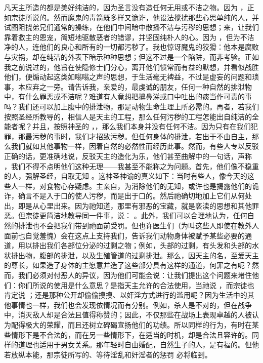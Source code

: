 凡天主所造的都是美好纯洁的，因为圣言没有造任何无用或不洁之物。因为  ，正如宗徒所说的。然而魔鬼的毒箭既多样又诡诈，他设法搅扰那些心思单纯的人，并试图阻挠弟兄们通常的操练，在他们中间暗中散播不洁与污秽的思想；来，让我们靠着救主的恩宠，简短地驱散恶者的错谬，并坚固纯朴人的心。因为  ，但为不洁净的人，连他们的良心和所有的一切都污秽了。我也惊讶魔鬼的狡猾：他本是腐败与灾祸，却在纯洁的外表下暗示种种思想；但这不过是一个陷阱，而非考验。正如我之前说过的，他旨在使隐修士们分心，离开他们惯常而有益的默想，并看似战胜他们，便煽动起这类如嗡嗡之声的思想，于生活毫无裨益，不过是虚妄的问题和琐事，本应弃之一旁。请告诉我，亲爱的，最虔诚的朋友，任何一种自然的排泄物中，有什么罪恶或不洁呢？难道有人竟想把擤鼻涕或口中吐出的痰当作可责的事吗？我们还可以加上腹中的排泄物，那是动物生命生理上所必需的。再者，若我们按照圣经所教导的，相信人是天主的工程，那么任何污秽的工程怎能出自纯洁的全能者呢？并且，按照神圣的 ，，那么我们本身并没有任何不洁。因为只有在我们犯罪，那最污秽的事时，我们才招致污秽。但任何身体的排泄，若出于不由自主，那么我们就如其他事物一样，因着自然的必然性而经历此事。然而，有些人专以反驳正确的话，更准确地说，反驳天主的造化为乐，他们甚至曲解中的一句话，声称  ，我们不得不点明他们这种无理——我甚至不能称之为问题。首先，他们像不稳重的人，强解圣经，自取无知 。这神圣神谕的真义如下：当时有些人，像今天的这些人一样，对食物心存疑虑。主亲自，为消除他们的无知，或许也是揭露他们的诡诈，确言不是入于口的使人污秽，而是出于口的。然后祂确切地加上它们从何处出，即是从心里出来。因为祂知道，那里有邪恶的宝藏，就是亵渎的思想和其他罪恶。但宗徒更简洁地教导同一件事，说： 。此外，我们可以合理地认为，任何自然的排泄也不会把我们带到祂面前受罚。但也许医生们（为叫这些人即使在教外人面前也自觉羞愧）会在这点上支持我们，告诉我们动物身体被赋予某些必要的通道，用以排出我们各部位分泌的过剩之物；例如，头部的过剩，有头发和头部的水状排出物，腹部的排泄，以及生殖管道的过剩排泄。那么，因天主的名，至爱天主的尊长，如果造了身体的主愿意并造了这些部分具有这样的通道，何罪之有呢？然而，我们必须对付恶人的异议，因为他们可能会说：让我们提出这个问题来堵住他们：你们所说的使用是什么意思？是指天主允许的合法使用，当祂说  ，而宗徒也肯定说  ；还是那种公开却偷偷摸摸、以奸淫方式进行的滥用呢？因为生活中的其他事情也一样，我们也会发现依情况而有分别。例如，杀人是不对的，但在战争中，消灭敌人却是合法且值得称赞的；因此，不仅那些在战场上表现卓越的人被认为配得极大的荣耀，而且还树立碑碣宣扬他们的功绩。所以同样的行为，有时在某些情形下是不合法的，而在另一些情形下，在适当的时机，却是合法且容许的。同样的道理也适用于男女关系。那年轻时自由婚配，自然生子的人，是有福的。但他若放纵本能，那宗徒所写的、等待淫乱和奸淫者的惩罚  必将临到。\par

